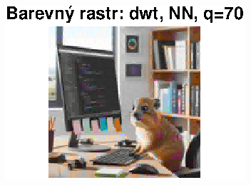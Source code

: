 \begin{figure}[H]
\begin{minipage}[b]{0.3\textwidth}
        \includegraphics[width=\textwidth]{images/barevny_dwt_NN_q70.eps}
    \end{minipage}
\end{figure}

